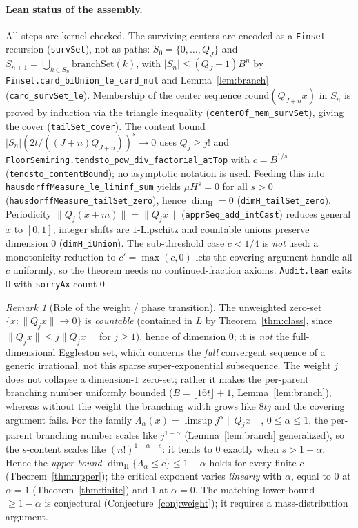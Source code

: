 \documentclass[11pt]{article}
\theoremstyle{definition}
\theoremstyle{remark}
\newtheorem{remark}[theorem]{Remark}
\newcommand{\dimH}{\dim_{\mathrm{H}}}
\newcommand{\Lam}{\Lambda}
\begin{document}
\paragraph{Lean status of the assembly.} All steps are kernel-checked.
The surviving centers are encoded as a \texttt{Finset} recursion
(\texttt{survSet}), not as paths: $S_0=\{0,\dots,Q_J\}$ and
$S_{n+1}=\bigcup_{k\in S_n}\mathrm{branchSet}(k)$, with
$|S_n|\le(Q_J+1)B^n$ by \texttt{Finset.card\_biUnion\_le\_card\_mul} and
Lemma~\ref{lem:branch} (\texttt{card\_survSet\_le}). Membership of the center
sequence $\mathrm{round}(Q_{J+n}x)$ in $S_n$ is proved by induction via the
triangle inequality (\texttt{centerOf\_mem\_survSet}), giving the cover
(\texttt{tailSet\_cover}). The content bound
$|S_n|(2t/((J+n)Q_{J+n}))^s\to0$ uses $Q_j\ge j!$ and
\texttt{FloorSemiring.tendsto\_pow\_div\_factorial\_atTop} with $c=B^{1/s}$
(\texttt{tendsto\_contentBound}); no asymptotic notation is used. Feeding this
into \texttt{hausdorffMeasure\_le\_liminf\_sum} yields $\mu H^s=0$ for all
$s>0$ (\texttt{hausdorffMeasure\_tailSet\_zero}), hence $\dimH=0$
(\texttt{dimH\_tailSet\_zero}). Periodicity
$\|Q_j(x+m)\|=\|Q_jx\|$ (\texttt{apprSeq\_add\_intCast}) reduces general $x$ to
$[0,1]$; integer shifts are $1$-Lipschitz and countable unions preserve
dimension $0$ (\texttt{dimH\_iUnion}). The sub-threshold case $c<1/4$ is
\emph{not} used: a monotonicity reduction to $c'=\max(c,0)$ lets the covering
argument handle all $c$ uniformly, so the theorem needs no continued-fraction
axioms. \texttt{Audit.lean} exits $0$ with \texttt{sorryAx} count $0$.

\begin{remark}[Role of the weight / phase transition]
The unweighted zero-set $\{x:\|Q_jx\|\to0\}$ is \emph{countable} (contained in
$L$ by Theorem~\ref{thm:class}, since $\|Q_jx\|\le j\|Q_jx\|$ for $j\ge1$), hence
of dimension $0$; it is \emph{not} the full-dimensional Eggleston set, which
concerns the \emph{full} convergent sequence of a generic irrational, not this
sparse super-exponential subsequence. The weight $j$ does not collapse a
dimension-$1$ zero-set; rather it makes the per-parent branching number
uniformly bounded ($B=\lfloor16t\rfloor+1$, Lemma~\ref{lem:branch}), whereas
without the weight the branching width grows like $8tj$ and the covering
argument fails. For the family $\Lam_\alpha(x)=\limsup j^\alpha\|Q_jx\|$,
$0\le\alpha\le1$, the per-parent branching number scales like $j^{1-\alpha}$
(Lemma~\ref{lem:branch} generalized), so the $s$-content scales like
$(n!)^{1-\alpha-s}$: it tends to $0$ exactly when $s>1-\alpha$. Hence the
\emph{upper bound} $\dimH\{\Lam_\alpha\le c\}\le1-\alpha$ holds for every finite
$c$ (Theorem~\ref{thm:upper}); the critical exponent varies \emph{linearly}
with $\alpha$, equal to $0$ at $\alpha=1$ (Theorem~\ref{thm:finite}) and $1$ at
$\alpha=0$. The matching lower bound $\ge1-\alpha$ is conjectural
(Conjecture~\ref{conj:weight}); it requires a mass-distribution argument.
\end{remark}
\end{document}
